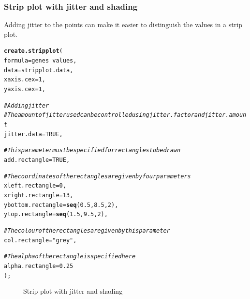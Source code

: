 \documentclass[letterpaper]{article}\usepackage[]{graphicx}\usepackage[]{color}
\makeatletter
\newcommand{\hlnum}[1]{\textcolor[rgb]{0.686,0.059,0.569}{#1}}%
\newcommand{\hlstr}[1]{\textcolor[rgb]{0.192,0.494,0.8}{#1}}%
\newcommand{\hlcom}[1]{\textcolor[rgb]{0.678,0.584,0.686}{\textit{#1}}}%
\newcommand{\hlopt}[1]{\textcolor[rgb]{0,0,0}{#1}}%
\newcommand{\hlstd}[1]{\textcolor[rgb]{0.345,0.345,0.345}{#1}}%
\newcommand{\hlkwc}[1]{\textcolor[rgb]{0.333,0.667,0.333}{#1}}%
\newcommand{\hlkwd}[1]{\textcolor[rgb]{0.737,0.353,0.396}{\textbf{#1}}}%
\newenvironment{kframe}{%
 \def\at@end@of@kframe{}%
 \ifinner\ifhmode%
  \def\at@end@of@kframe{\end{minipage}}%
  \begin{minipage}{\columnwidth}%
 \fi\fi%
 \def\FrameCommand##1{\hskip\@totalleftmargin \hskip-\fboxsep
 \colorbox{shadecolor}{##1}\hskip-\fboxsep
     \hskip-\linewidth \hskip-\@totalleftmargin \hskip\columnwidth}%
 \MakeFramed {\advance\hsize-\width
   \@totalleftmargin\z@ \linewidth\hsize
   \@setminipage}}%
 {\par\unskip\endMakeFramed%
 \at@end@of@kframe}
\newenvironment{knitrout}{}{} %
\makeatother
\begin{document}
\subsubsection{Strip plot with jitter and shading}
Adding jitter to the points can make it easier to distinguish the values in a strip plot.
\begin{knitrout}
\color{fgcolor}\begin{kframe}
\begin{alltt}
\hlkwd{create.stripplot}\hlstd{(}
    \hlkwc{formula} \hlstd{= genes} \hlopt{~} \hlstd{values,}
    \hlkwc{data} \hlstd{= stripplot.data,}
    \hlkwc{xaxis.cex} \hlstd{=} \hlnum{1}\hlstd{,}
    \hlkwc{yaxis.cex} \hlstd{=} \hlnum{1}\hlstd{,}

    \hlcom{# Adding jitter}
    \hlcom{# The amount of jitter used can be controlled using jitter.factor and jitter.amount}
    \hlkwc{jitter.data} \hlstd{=} \hlnum{TRUE}\hlstd{,}

    \hlcom{# This parameter must be specified for rectangles to be drawn}
    \hlkwc{add.rectangle} \hlstd{=} \hlnum{TRUE}\hlstd{,}

    \hlcom{# The coordinates of the rectangles are given by four parameters}
    \hlkwc{xleft.rectangle} \hlstd{=} \hlnum{0}\hlstd{,}
    \hlkwc{xright.rectangle} \hlstd{=} \hlnum{13}\hlstd{,}
    \hlkwc{ybottom.rectangle} \hlstd{=} \hlkwd{seq}\hlstd{(}\hlnum{0.5}\hlstd{,} \hlnum{8.5}\hlstd{,} \hlnum{2}\hlstd{),}
    \hlkwc{ytop.rectangle} \hlstd{=} \hlkwd{seq}\hlstd{(}\hlnum{1.5}\hlstd{,} \hlnum{9.5}\hlstd{,} \hlnum{2}\hlstd{),}

    \hlcom{# The colour of the rectangles are given by this parameter}
    \hlkwc{col.rectangle} \hlstd{=} \hlstr{"grey"}\hlstd{,}

    \hlcom{# The alpha of the rectangle is specified here}
    \hlkwc{alpha.rectangle} \hlstd{=} \hlnum{0.25}
    \hlstd{);}
\end{alltt}
\end{kframe}\begin{figure}[]


{\centering {} 

}

\caption[Strip plot with jitter and shading]{Strip plot with jitter and shading\label{fig:stripplot2}}
\end{figure}


\end{knitrout}
\end{document}
